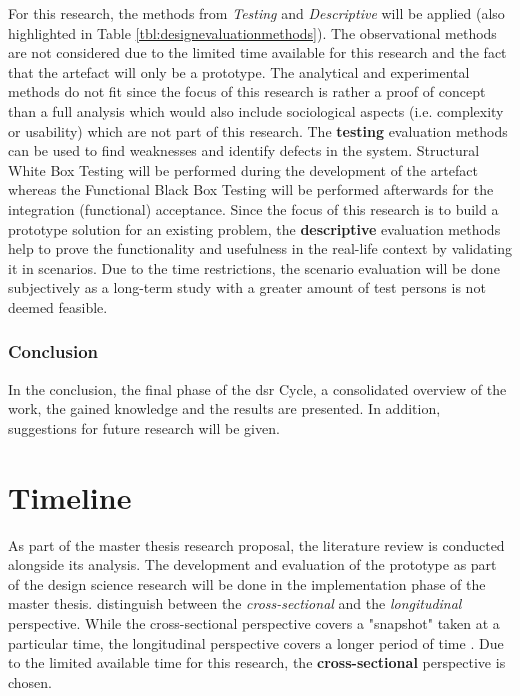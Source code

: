 For this research, the methods from \textit{Testing} and \textit{Descriptive} will be applied (also highlighted in Table \ref{tbl:designevaluationmethods}). \newline
The observational methods are not considered due to the limited time available for this research and the fact that the artefact will only be a prototype. The analytical and experimental methods do not fit since the focus of this research is rather a proof of concept than a full analysis which would also include sociological aspects (i.e. complexity or usability) which are not part of this research.\newline
The \textbf{testing} evaluation methods can be used to find weaknesses and identify defects in the system. Structural White Box Testing will be performed during the development of the artefact whereas the Functional Black Box Testing will be performed afterwards for the integration (functional) acceptance. \newline
Since the focus of this research is to build a prototype solution for an existing problem, the \textbf{descriptive} evaluation methods help to prove the functionality and usefulness in the real-life context by validating it in scenarios. Due to the time restrictions, the scenario evaluation will be done subjectively as a long-term study with a greater amount of test persons is not deemed feasible. \newline



\subsubsection{Conclusion}

In the conclusion, the final phase of the \gls{dsr} Cycle, a consolidated overview of the work, the gained knowledge and the results are presented. In addition, suggestions for future research will be given.



\section{Timeline}

As part of the master thesis research proposal, the literature review is conducted alongside its analysis. The development and evaluation of the prototype as part of the design science research will be done in the implementation phase of the master thesis.\newline
\cite{Saunders2009} distinguish between the \textit{cross-sectional} and the \textit{longitudinal} perspective. While the cross-sectional perspective covers a "snapshot" taken at a particular time, the longitudinal perspective covers a longer period of time \citep{Saunders2009}. Due to the limited available time for this research, the \textbf{cross-sectional} perspective is chosen.


